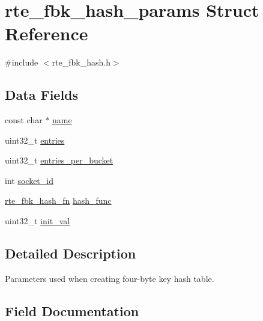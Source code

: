 \hypertarget{structrte__fbk__hash__params}{}\section{rte\+\_\+fbk\+\_\+hash\+\_\+params Struct Reference}
\label{structrte__fbk__hash__params}


{\ttfamily \#include $<$rte\+\_\+fbk\+\_\+hash.\+h$>$}

\subsection*{Data Fields}
\begin{DoxyCompactItemize}
\item 
const char $\ast$ \hyperlink{structrte__fbk__hash__params_a8f8f80d37794cde9472343e4487ba3eb}{name}
\item 
uint32\+\_\+t \hyperlink{structrte__fbk__hash__params_a38bad35c844ffd72b0c1132715d5f3a1}{entries}
\item 
uint32\+\_\+t \hyperlink{structrte__fbk__hash__params_af0ce764518ddc03478daa97695cd096e}{entries\+\_\+per\+\_\+bucket}
\item 
int \hyperlink{structrte__fbk__hash__params_a229cb0bd24215f0cb940e0724dbd4d55}{socket\+\_\+id}
\item 
\hyperlink{rte__fbk__hash_8h_ac562ee5335703bbd3caaa4a63748f95f}{rte\+\_\+fbk\+\_\+hash\+\_\+fn} \hyperlink{structrte__fbk__hash__params_a69f0a1b6157a850ab077f407294b0669}{hash\+\_\+func}
\item 
uint32\+\_\+t \hyperlink{structrte__fbk__hash__params_aa9c51f653df7b8a657a31d12ce9a214b}{init\+\_\+val}
\end{DoxyCompactItemize}


\subsection{Detailed Description}
Parameters used when creating four-\/byte key hash table. 

\subsection{Field Documentation}
\hypertarget{structrte__fbk__hash__params_a38bad35c844ffd72b0c1132715d5f3a1}{}
